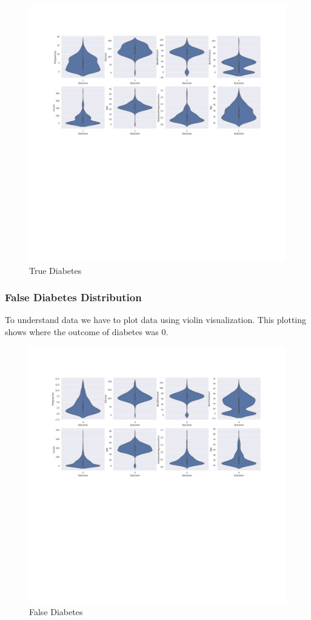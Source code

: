 \documentclass[
]{article}
\begin{document}
\begin{figure}
\centering
\includegraphics{truediab.jpg}
\caption{True Diabetes}
\end{figure}

\hypertarget{false-diabetes-distribution}{%
\subsubsection{False Diabetes
Distribution}\label{false-diabetes-distribution}}

To understand data we have to plot data using violin visualization. This
plotting shows where the outcome of diabetes was 0.

\begin{figure}
\centering
\includegraphics{falsediab.jpg}
\caption{False Diabetes}
\end{figure}
\end{document}

